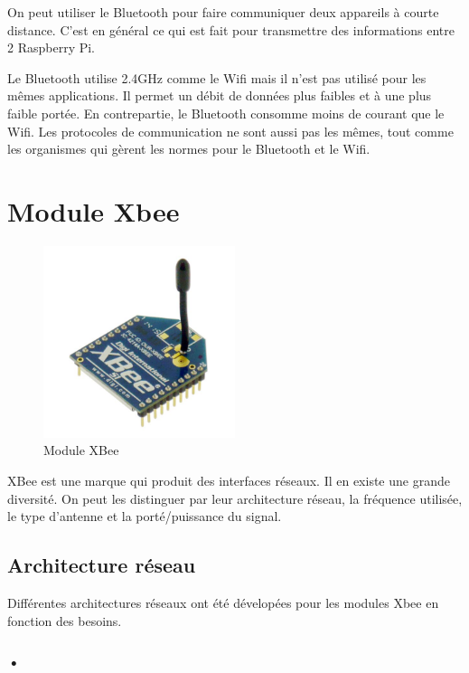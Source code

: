 \documentclass[a4paper, 11pt]{report}
\begin{document}
On peut utiliser le Bluetooth pour faire communiquer deux appareils à courte distance. C'est en général ce qui est fait pour transmettre des informations entre 2 Raspberry Pi.

Le Bluetooth utilise 2.4GHz comme le Wifi mais il n'est pas utilisé pour les mêmes applications. Il permet un débit de données plus faibles et à une plus faible portée. En contrepartie, le Bluetooth consomme moins de courant que le Wifi. Les protocoles de communication ne sont aussi pas les mêmes, tout comme les organismes qui gèrent les normes pour le Bluetooth et le Wifi.

\section{Module Xbee}

\begin{figure}[h]
\begin{centering}
\includegraphics[width=0.5\textwidth]{images/XBee.jpg}
\caption{Module XBee}
\par\end{centering}
\end{figure}

XBee est une marque qui produit des interfaces réseaux. Il en existe une grande diversité. On peut les distinguer par leur architecture réseau, la fréquence utilisée, le type d'antenne et la porté/puissance du signal.

\subsection{Architecture réseau}
Différentes architectures réseaux ont été dévelopées pour les modules Xbee en fonction des besoins.
\subsubsection{•}
\end{document}
